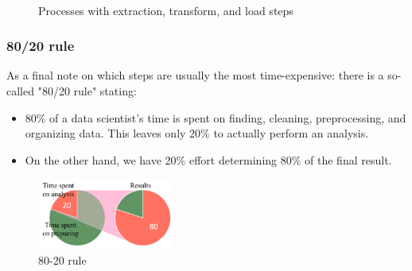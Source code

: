 \begin{figure}[H]
  \centering

  \\\vspace*{0.5cm}

  \caption{Processes with extraction, transform, and load steps}
  \label{fig:1_etl_and_elt}
\end{figure}

\subsubsection*{80/20 rule}
As a final note on which steps are usually the most time-expensive: there is a so-called "80/20 rule" stating:
\begin{itemize}
  \item 80\% of a data scientist's time is spent on finding, cleaning, preprocessing, and organizing data. This leaves only 20\% to actually perform an analysis.
  \item On the other hand, we have 20\% effort determining 80\% of the final result.
\end{itemize}

\begin{figure}[H]
  \centering
  \includegraphics[width=0.4\textwidth]{assets/basics/80_20.png}
  \caption{80-20 rule}
  \label{fig:1_80_20}
\end{figure}